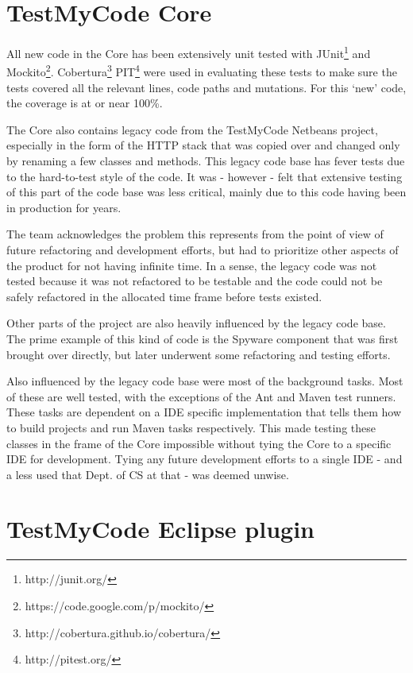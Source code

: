 \documentclass[12pt,a4paper,english,leqno]{article}
\begin{document}
\section{TestMyCode Core}

All new code in the Core has been extensively unit tested with JUnit\footnote{http://junit.org/} and Mockito\footnote{https://code.google.com/p/mockito/}.
Cobertura\footnote{http://cobertura.github.io/cobertura/} PIT\footnote{http://pitest.org/} were used in evaluating these tests to make sure the tests covered all the relevant lines, code paths and mutations. For this `new' code, the coverage is at or near 100\%.

The Core also contains legacy code from the TestMyCode Netbeans project, especially in the form of the HTTP stack that was copied over and changed only by renaming a few classes and methods.
This legacy code base has fever tests due to the hard-to-test style of the code.
It was - however - felt that extensive testing of this part of the code base was less critical, mainly due to this code having been in production for years.

The team acknowledges the problem this represents from the point of view of future refactoring and development efforts, but had to prioritize other aspects of the product for not having infinite time.
In a sense, the legacy code was not tested because it was not refactored to be testable and the code could not be safely refactored in the allocated time frame before tests existed.

Other parts of the project are also heavily influenced by the legacy code base. The prime example of this kind of code is the Spyware component that was first brought over directly, but later underwent some refactoring and testing efforts.

Also influenced by the legacy code base were most of the background tasks. Most of these are well tested, with the exceptions of the Ant and Maven test runners.
These tasks are dependent on a IDE specific implementation that tells them how to build projects and run Maven tasks respectively.
This made testing these classes in the frame of the Core impossible without tying the Core to a specific IDE for development.
Tying any future development efforts to a single IDE - and a less used that Dept. of CS at that - was deemed unwise.
 
\section{TestMyCode Eclipse plugin}
\end{document}
